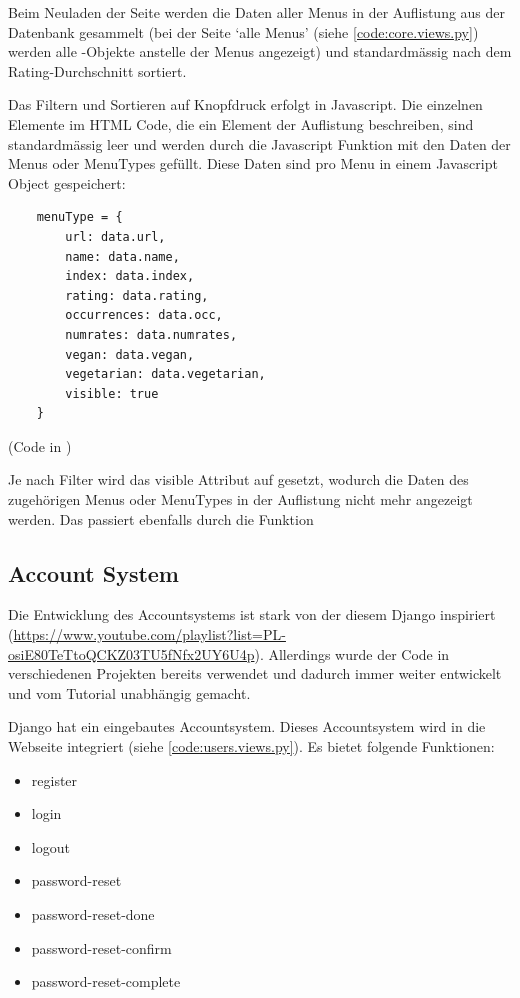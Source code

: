 Beim Neuladen der Seite werden die Daten aller Menus in der Auflistung aus der
Datenbank gesammelt (bei der Seite `alle Menus' (siehe \ref{code:core.views.py})
werden alle -Objekte anstelle der Menus angezeigt) und
standardmässig nach dem Rating-Durchschnitt sortiert. 

Das Filtern und Sortieren auf Knopfdruck erfolgt in Javascript. Die einzelnen
 Elemente im HTML Code, die ein Element der Auflistung beschreiben,
sind standardmässig leer und werden durch die Javascript Funktion
 mit den Daten der Menus oder MenuTypes gefüllt. Diese Daten sind pro
Menu in einem Javascript Object gespeichert:

\begin{lstlisting}
    menuType = {
        url: data.url,
        name: data.name,
        index: data.index,
        rating: data.rating,
        occurrences: data.occ,
        numrates: data.numrates,
        vegan: data.vegan,
        vegetarian: data.vegetarian,
        visible: true
    }
\end{lstlisting}

(Code in )

Je nach Filter wird das visible Attribut auf  gesetzt, wodurch die
Daten des zugehörigen Menus oder MenuTypes in der Auflistung nicht mehr
angezeigt werden. Das passiert ebenfalls durch die  Funktion

\newpage

\subsection{Account System} \label{spez:Account}

Die Entwicklung des Accountsystems ist stark von der diesem Django inspiriert
(\url{https://www.youtube.com/playlist?list=PL-osiE80TeTtoQCKZ03TU5fNfx2UY6U4p}).
Allerdings wurde der Code in verschiedenen Projekten bereits verwendet und
dadurch immer weiter entwickelt und vom Tutorial unabhängig gemacht.

Django hat ein eingebautes Accountsystem. Dieses Accountsystem wird in die
Webseite integriert (siehe \ref{code:users.views.py}). Es bietet folgende
Funktionen:
\begin{itemize}
    \item register
    \item login
    \item logout
    \item password-reset
    \item password-reset-done
    \item password-reset-confirm
    \item password-reset-complete
\end{itemize}

